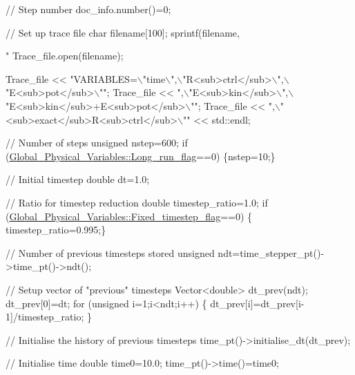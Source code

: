 \begin{DoxyCodeInclude}
{{{ \textcolor{comment}{// Step number}
 doc\_info.number()=0;

 \textcolor{comment}{// Set up trace file}
 \textcolor{keywordtype}{char} filename[100];
 sprintf(filename,\textcolor{stringliteral}{"%
 Trace\_file.open(filename);

 Trace\_file <<  \textcolor{stringliteral}{"VARIABLES=\(\backslash\)"time\(\backslash\)",\(\backslash\)"R<sub>ctrl</sub>\(\backslash\)",\(\backslash\)"E<sub>pot</sub>\(\backslash\)""};
 Trace\_file << \textcolor{stringliteral}{",\(\backslash\)"E<sub>kin</sub>\(\backslash\)",\(\backslash\)"E<sub>kin</sub>+E<sub>pot</sub>\(\backslash\)""};
 Trace\_file << \textcolor{stringliteral}{",\(\backslash\)"<sub>exact</sub>R<sub>ctrl</sub>\(\backslash\)""} 
            << std::endl;
 
 \textcolor{comment}{// Number of steps}
 \textcolor{keywordtype}{unsigned} nstep=600; 
 \textcolor{keywordflow}{if} (\hyperlink{namespaceGlobal__Physical__Variables_acb18f0e4952b6a1b0840ca94828ace3b}{Global\_Physical\_Variables::Long\_run\_flag}==0) \{nstep=10;\}

 \textcolor{comment}{// Initial timestep}
 \textcolor{keywordtype}{double} dt=1.0;

 \textcolor{comment}{// Ratio for timestep reduction}
 \textcolor{keywordtype}{double} timestep\_ratio=1.0;
 \textcolor{keywordflow}{if} (\hyperlink{namespaceGlobal__Physical__Variables_aae2e69454e5e73519e13dd3424d41a2c}{Global\_Physical\_Variables::Fixed\_timestep\_flag}==0) \{
      timestep\_ratio=0.995;\}

 \textcolor{comment}{// Number of previous timesteps stored}
 \textcolor{keywordtype}{unsigned} ndt=time\_stepper\_pt()->time\_pt()->ndt();

 \textcolor{comment}{// Setup vector of "previous" timesteps}
 Vector<double> dt\_prev(ndt);
 dt\_prev[0]=dt; 
 \textcolor{keywordflow}{for} (\textcolor{keywordtype}{unsigned} i=1;i<ndt;i++)
  \{
   dt\_prev[i]=dt\_prev[i-1]/timestep\_ratio;
  \}

 \textcolor{comment}{// Initialise the history of previous timesteps}
 time\_pt()->initialise\_dt(dt\_prev);

 \textcolor{comment}{// Initialise time}
 \textcolor{keywordtype}{double} time0=10.0;
 time\_pt()->time()=time0;

}}}}
\end{DoxyCodeInclude}
